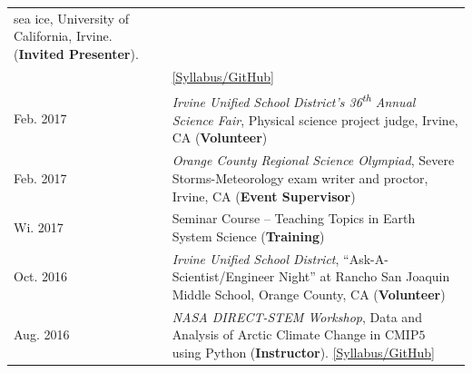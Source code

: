 \documentclass[margin,line,palatino,courier,10pt]{res}
\begin{document}
\begin{resume}
\begin{tabular}{@{}p{0.9in}p{4in}}
sea ice, University of California, Irvine. (\textbf{Invited Presenter}).\\ & \href{https://github.com/UCIDataScienceInitiative/Climate_Hackathon}{[Syllabus/GitHub]}\\
Feb. 2017 & \textit{Irvine Unified School District's 36\textsuperscript{th} Annual Science Fair}, Physical science project judge, Irvine, CA (\textbf{Volunteer})\\
Feb. 2017 & \textit{Orange County Regional Science Olympiad}, Severe Storms-Meteorology exam writer and proctor, Irvine, CA (\textbf{Event Supervisor})\\
Wi. 2017 & Seminar Course -- Teaching Topics in Earth System Science (\textbf{Training})\\
Oct. 2016 & \textit{Irvine Unified School District}, ``Ask-A-Scientist/Engineer Night'' at Rancho San Joaquin Middle School, Orange County, CA (\textbf{Volunteer})\\
Aug. 2016 & \textit{NASA DIRECT-STEM Workshop}, Data and Analysis of Arctic Climate Change in CMIP$5$ using Python (\textbf{Instructor}). \href{https://github.com/strongh/DIRECT-STEM-climate-workshop}{[Syllabus/GitHub]}\\
\end{tabular}

\noindent\textcolor{Cerulean}{\makebox[\linewidth][r]{\rule{\textwidth}{5pt}}}

\end{resume}
\end{document}
